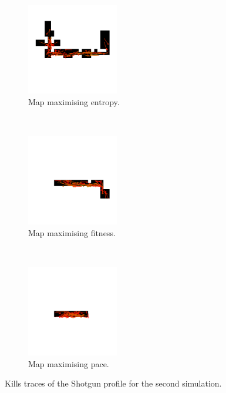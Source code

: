 \begin{figure}[H]
    \centering
    \begin{subfigure}[t]{0.3\textwidth}
        \centering
        \includegraphics[height=4.0cm]{Images/images/experiment_one/best_entropy_pop_1/kill_traces_bot_0.png}
        \caption{Map maximising entropy.}
    \end{subfigure}%
    ~ 
    \begin{subfigure}[t]{0.3\textwidth}
        \centering
        \includegraphics[height=4.0cm]{Images/images/experiment_one/best_fitness_pop_1/kill_traces_bot_0.png}
        \caption{Map maximising fitness.}
    \end{subfigure}
    ~ 
    \begin{subfigure}[t]{0.3\textwidth}
        \centering
        \includegraphics[height=4.0cm]{Images/images/experiment_one/best_pace_pop_1/kill_traces_bot_0.png}
        \caption{Map maximising pace.}
    \end{subfigure}
    \caption{Kills traces of the Shotgun profile for the second simulation.}
\end{figure}

\newpage

